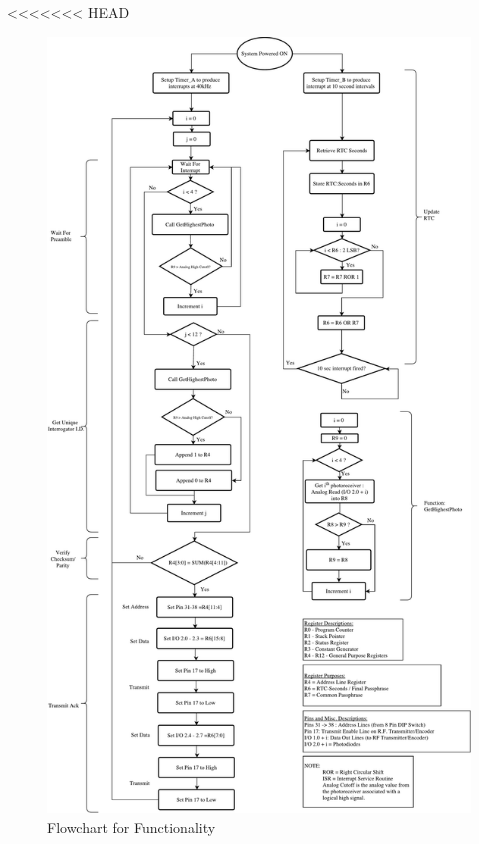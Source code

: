 \documentclass[letterpaper,10pt]{article}
\begin{document}
\begin{spacing}{1.15}
<<<<<<< HEAD
\begin{figure} [H]
	\centering
	\includegraphics[scale=0.400]{Friendly_Target_Software_Flowchart.pdf}
	\caption{Flowchart for Functionality\label{fig:friendly-target-software-flowchart}}
\end{figure}


\end{spacing}
\end{document}
